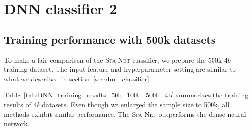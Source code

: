 \documentclass[12pt]{article}
\begin{document}
\section{DNN classifier 2}%
\label{sec:dnn_classifier_2}
    \subsection{Training performance with 500k datasets}%
    \label{sub:training_performance_with_500k_datasets}
        To make a fair comparison of the \textsc{Spa-Net} classifier, we prepare the 500k $4b$ training dataset. The input feature and hyperparameter setting are similar to what we described in section~\ref{sec:dnn_classifier}.

        Table~\ref{tab:DNN_training_results_50k_100k_500k_4b} summarizes the training results of $4b$ datasets. Even though we enlarged the sample size to 500k, all methods exhibit similar performance. The \textsc{Spa-Net} outperforms the dense neural network.
\end{document}
